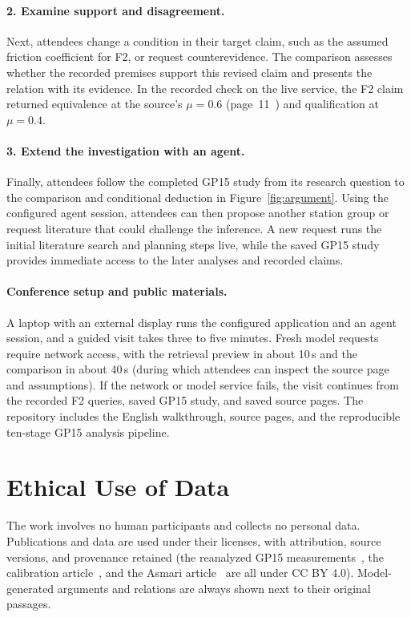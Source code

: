 \documentclass[sigconf,screen,review]{acmart}
\begin{document}
\paragraph{2. Examine support and disagreement.}
Next, attendees change a condition in their target claim, such as the assumed friction coefficient for F2, or request counterevidence. The comparison assesses whether the recorded premises support this revised claim and presents the relation with its evidence. In the recorded check on the live service, the F2 claim returned equivalence at the source's $\mu=0.6$ (page~11~\cite{asmari}) and qualification at $\mu=0.4$.

\paragraph{3. Extend the investigation with an agent.}
Finally, attendees follow the completed GP15 study from its research question to the comparison and conditional deduction in Figure~\ref{fig:argument}. Using the configured agent session, attendees can then propose another station group or request literature that could challenge the inference. A new request runs the initial literature search and planning steps live, while the saved GP15 study provides immediate access to the later analyses and recorded claims.

\paragraph{Conference setup and public materials.}
A laptop with an external display runs the configured application and an agent session, and a guided visit takes three to five minutes. Fresh model requests require network access, with the retrieval preview in about 10\,s and the comparison in about 40\,s (during which attendees can inspect the source page and assumptions). If the network or model service fails, the visit continues from the recorded F2 queries, saved GP15 study, and saved source pages. The repository includes the English walkthrough, source pages, and the reproducible ten-stage GP15 analysis pipeline.

\section{Ethical Use of Data}
The work involves no human participants and collects no personal data. Publications and data are used under their licenses, with attribution, source versions, and provenance retained (the reanalyzed GP15 measurements~\cite{gp15}, the calibration article~\cite{lin2024}, and the Asmari article~\cite{asmari} are all under CC BY 4.0). Model-generated arguments and relations are always shown next to their original passages.
\end{document}
